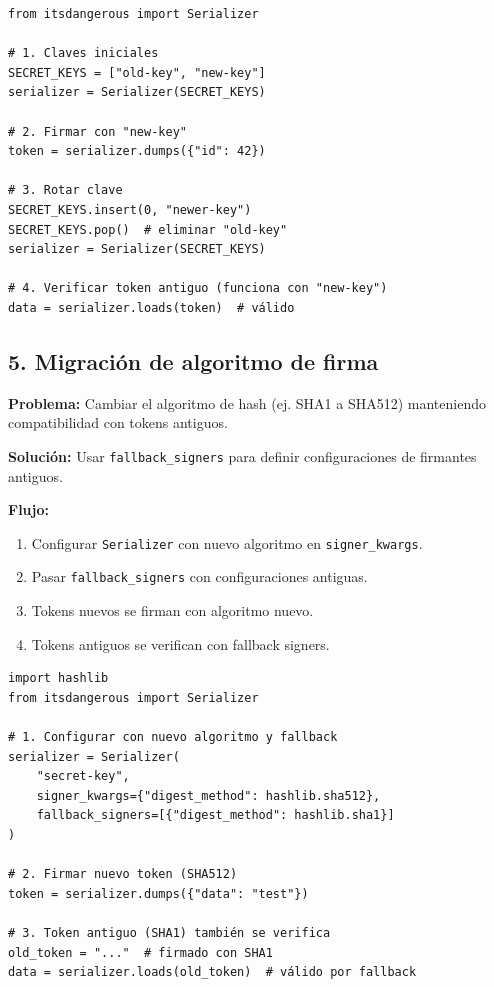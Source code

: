 \documentclass[11pt,a4paper]{article}
\begin{document}
\begin{lstlisting}
from itsdangerous import Serializer

# 1. Claves iniciales
SECRET_KEYS = ["old-key", "new-key"]
serializer = Serializer(SECRET_KEYS)

# 2. Firmar con "new-key"
token = serializer.dumps({"id": 42})

# 3. Rotar clave
SECRET_KEYS.insert(0, "newer-key")
SECRET_KEYS.pop()  # eliminar "old-key"
serializer = Serializer(SECRET_KEYS)

# 4. Verificar token antiguo (funciona con "new-key")
data = serializer.loads(token)  # válido
\end{lstlisting}


\subsection*{5. Migración de algoritmo de firma}


\textbf{Problema:} Cambiar el algoritmo de hash (ej. SHA1 a SHA512) manteniendo compatibilidad con tokens antiguos.


\textbf{Solución:} Usar \texttt{fallback\_signers} para definir configuraciones de firmantes antiguos.


\textbf{Flujo:}


\begin{enumerate}[leftmargin=*,topsep=2pt,itemsep=1pt]
  \item Configurar \texttt{Serializer} con nuevo algoritmo en \texttt{signer\_kwargs}.
  \item Pasar \texttt{fallback\_signers} con configuraciones antiguas.
  \item Tokens nuevos se firman con algoritmo nuevo.
  \item Tokens antiguos se verifican con fallback signers.
\end{enumerate}


\begin{lstlisting}
import hashlib
from itsdangerous import Serializer

# 1. Configurar con nuevo algoritmo y fallback
serializer = Serializer(
    "secret-key",
    signer_kwargs={"digest_method": hashlib.sha512},
    fallback_signers=[{"digest_method": hashlib.sha1}]
)

# 2. Firmar nuevo token (SHA512)
token = serializer.dumps({"data": "test"})

# 3. Token antiguo (SHA1) también se verifica
old_token = "..."  # firmado con SHA1
data = serializer.loads(old_token)  # válido por fallback
\end{lstlisting}
\end{document}
